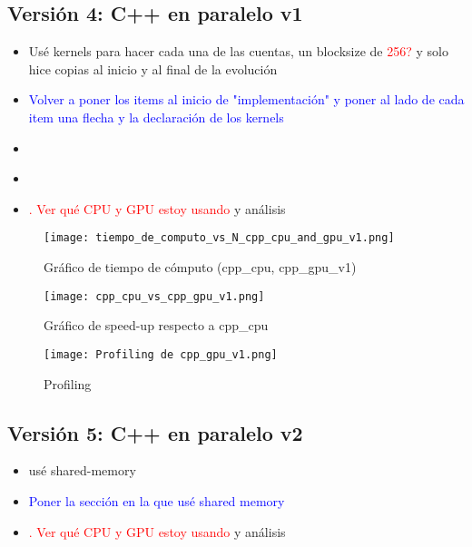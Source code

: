 \documentclass[aps,prb,twocolumn,superscriptaddress,floatfix,longbibliography]{revtex4-2}
\newcounter{para}
\begin{document}
\begin{itemize}
\subsection{Versión 4: C++ en paralelo v1}

\begin{itemize}
    \item Usé kernels para hacer cada una de las cuentas, un blocksize de \textcolor{red}{256?} y solo hice copias al inicio y al final de la evolución
    \item \textcolor{blue}{Volver a poner los items al inicio de "implementación" y poner al lado de cada item una flecha y la declaración de los kernels}
    \item \textcolor{blue}{}
    \item \textcolor{blue}{}
    \item \textcolor{red}{. Ver qué CPU y GPU estoy usando} y análisis
\end{itemize}

\begin{figure}[h]
    \texttt{[image: tiempo\_de\_computo\_vs\_N\_cpp\_cpu\_and\_gpu\_v1.png]}
    \caption{Gráfico de tiempo de cómputo (cpp_cpu, cpp_gpu_v1)}
     \label{fig:tiempo_de_computo_vs_N_cpp_cpu_and_gpu_v1}
\end{figure}


\begin{figure}[h]
    \texttt{[image: cpp\_cpu\_vs\_cpp\_gpu\_v1.png]}
    \caption{Gráfico de speed-up respecto a cpp_cpu}
     \label{fig:cpp_cpu_vs_cpp_gpu_v1}
\end{figure}


\begin{figure}[h]
    \texttt{[image: Profiling de cpp\_gpu\_v1.png]}
    \caption{Profiling}
     \label{fig:Profiling de cpp_gpu_v1}
\end{figure}




\subsection{Versión 5: C++ en paralelo v2}

\begin{itemize}
    \item usé shared-memory
    \item \textcolor{blue}{Poner la sección en la que usé shared memory}
    \item \textcolor{red}{. Ver qué CPU y GPU estoy usando} y análisis
\end{itemize}


\end{itemize}
\end{document}
